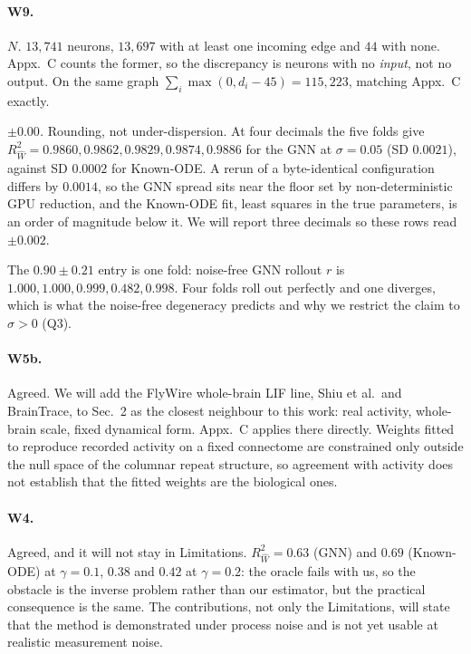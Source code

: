 
\paragraph{W9.}
\emph{$N$.} $13{,}741$ neurons, $13{,}697$ with at least one incoming edge and
$44$ with none. Appx.~C counts the former, so the discrepancy is neurons with no
\emph{input}, not no output. On the same graph
$\sum_i \max(0, d_i - 45) = 115{,}223$, matching Appx.~C exactly.

\emph{$\pm 0.00$.} Rounding, not under-dispersion. At four decimals the five
folds give $R^2_{\widehat W} = 0.9860, 0.9862, 0.9829, 0.9874, 0.9886$ for the
GNN at $\sigma = 0.05$ (SD $0.0021$), against SD $0.0002$ for Known-ODE. A rerun
of a byte-identical configuration differs by $0.0014$, so the GNN spread sits
near the floor set by non-deterministic GPU reduction, and the Known-ODE fit,
least squares in the true parameters, is an order of magnitude below it. We will
report three decimals so these rows read $\pm 0.002$.

The $0.90 \pm 0.21$ entry is one fold: noise-free GNN rollout $r$ is
$1.000, 1.000, 0.999, 0.482, 0.998$. Four folds roll out perfectly and one
diverges, which is what the noise-free degeneracy predicts and why we restrict
the claim to $\sigma > 0$ (Q3).

\paragraph{W5b.}
Agreed. We will add the FlyWire whole-brain LIF line, Shiu et al.\ and
BrainTrace, to Sec.~2 as the closest neighbour to this work: real activity,
whole-brain scale, fixed dynamical form. Appx.~C applies there directly. Weights
fitted to reproduce recorded activity on a fixed connectome are constrained only
outside the null space of the columnar repeat structure, so agreement with
activity does not establish that the fitted weights are the biological ones.

\paragraph{W4.}
Agreed, and it will not stay in Limitations. $R^2_{\widehat W} = 0.63$ (GNN) and
$0.69$ (Known-ODE) at $\gamma = 0.1$, $0.38$ and $0.42$ at $\gamma = 0.2$: the
oracle fails with us, so the obstacle is the inverse problem rather than our
estimator, but the practical consequence is the same. The contributions, not only
the Limitations, will state that the method is demonstrated under process noise
and is not yet usable at realistic measurement noise.

